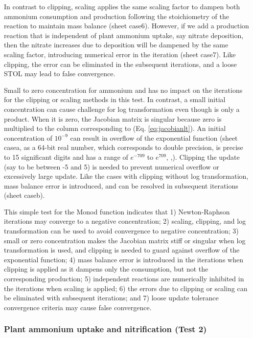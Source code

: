 \documentclass[gmd, manuscript]{copernicus}
\begin{document}
In contrast to clipping, scaling applies the same scaling factor to dampen both ammonium consumption and  production following the stoichiometry of the reaction to maintain mass balance (sheet case6). However, if we add a production reaction that is independent of plant ammonium uptake, say nitrate deposition, then the nitrate increases due to deposition will be dampened by the same scaling factor, introducing numerical error in the iteration (sheet case7). Like clipping, the error can be eliminated in the subsequent iterations, and a loose STOL may lead to false convergence.

Small to zero concentration for ammonium and  has no impact on the iterations for the clipping or scaling methods in this test. In contrast, a small initial  concentration can cause challenge for log transformation even though  is only a product. When it is zero, the Jacobian matrix is singular because zero is multiplied to the column corresponding to  (Eq. \ref{eq:jacobianlt}). An initial  concentration of $10^{-9}$ can result in overflow of the exponential function (sheet casea, as a 64-bit real number, which corresponds to double precision, is precise to 15 significant digits and has a range of $e^{-709}$ to $e^{709}$, \citeauthor{Lemmon2005},\citeyear{Lemmon2005}). Clipping the update (say to be between -5 and 5) is needed to prevent numerical overflow or excessively large update. Like the cases with clipping without log transformation, mass balance error is introduced, and can be resolved in subsequent iterations (sheet caseb).

This simple test for the Monod function indicates that 
1) Newton-Raphson iterations may converge to a negative concentration; 
2) scaling, clipping, and log transformation can be used to avoid convergence to negative concentration; 
3) small or zero concentration makes the Jacobian matrix stiff or singular when log transformation is used, and clipping is needed to guard against overflow of the exponential function; 
4) mass balance error is introduced in the iterations when clipping is applied as it dampens only the consumption, but not the corresponding production; 
5) independent reactions are numerically inhibited in the iterations when scaling is applied; 
6) the errors due to clipping or scaling can be eliminated with subsequent iterations; and
7) loose update tolerance convergence criteria may cause false convergence.

\subsubsection{Plant ammonium uptake and nitrification (Test 2)}
\end{document}
